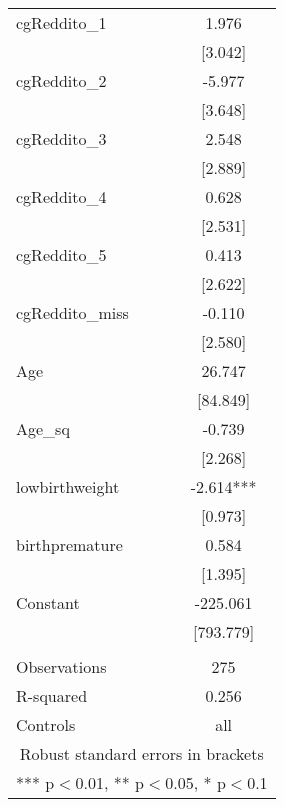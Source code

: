 \documentclass[]{article}
\begin{document}
\begin{tabular}{lc}
cgReddito\_1 & 1.976 \\
 & [3.042] \\
cgReddito\_2 & -5.977 \\
 & [3.648] \\
cgReddito\_3 & 2.548 \\
 & [2.889] \\
cgReddito\_4 & 0.628 \\
 & [2.531] \\
cgReddito\_5 & 0.413 \\
 & [2.622] \\
cgReddito\_miss & -0.110 \\
 & [2.580] \\
Age & 26.747 \\
 & [84.849] \\
Age\_sq & -0.739 \\
 & [2.268] \\
lowbirthweight & -2.614*** \\
 & [0.973] \\
birthpremature & 0.584 \\
 & [1.395] \\
Constant & -225.061 \\
 & [793.779] \\
 &  \\
Observations & 275 \\
R-squared & 0.256 \\
 Controls & all \\ \hline
\multicolumn{2}{c}{ Robust standard errors in brackets} \\
\multicolumn{2}{c}{ *** p$<$0.01, ** p$<$0.05, * p$<$0.1} \\
\end{tabular}
\end{document}
